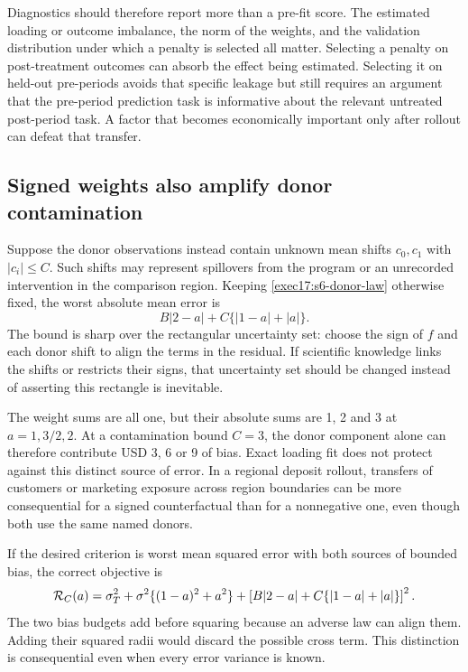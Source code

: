 Diagnostics should therefore report more than a pre-fit score. The
estimated loading or outcome imbalance, the norm of the weights, and the
validation distribution under which a penalty is selected all matter.
Selecting a penalty on post-treatment outcomes can absorb the effect
being estimated. Selecting it on held-out pre-periods avoids that specific
leakage but still requires an argument that the pre-period prediction task
is informative about the relevant untreated post-period task. A factor that
becomes economically important only after rollout can defeat that transfer.

\subsection{Signed weights also amplify donor contamination}

Suppose the donor observations instead contain unknown mean shifts $c_0,c_1$
with $|c_i|\leq C$. Such shifts may represent spillovers from the program
or an unrecorded intervention in the comparison region. Keeping
\eqref{exec17:s6-donor-law} otherwise fixed, the worst absolute mean error is
\begin{equation}
 B|2-a|+C\{|1-a|+|a|\}.
 \label{exec17:s6-contamination-radius}
\end{equation}
The bound is sharp over the rectangular uncertainty set: choose the sign of
$f$ and each donor shift to align the terms in the residual. If scientific
knowledge links the shifts or restricts their signs, that uncertainty set
should be changed instead of asserting this rectangle is inevitable.

The weight sums are all one, but their absolute sums are 1, 2 and 3
at $a=1,3/2,2$. At a contamination bound $C=3$, the donor component
alone can therefore contribute USD 3, 6 or 9 of bias. Exact loading fit
does not protect against this distinct source of error. In a regional
deposit rollout, transfers of customers or marketing exposure across region
boundaries can be more consequential for a signed counterfactual than for
a nonnegative one, even though both use the same named donors.

If the desired criterion is worst mean squared error with both sources of
bounded bias, the correct objective is
\begin{equation}
 {\cal R}_C(a)=\sigma_T^2+\sigma^2\{(1-a)^2+a^2\}
       +\left[B|2-a|+C\{|1-a|+|a|\}\right]^2.
 \label{exec17:s6-contaminated-risk}
\end{equation}
The two bias budgets add before squaring because an adverse law can align
them. Adding their squared radii would discard the possible cross term.
This distinction is consequential even when every error variance is known.

